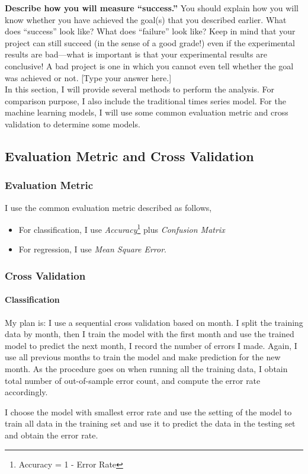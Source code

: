 \documentclass[a4paper,11pt]{article}
\begin{document}
\textbf{Describe how you will measure “success.”} You should explain how you will know whether you have achieved the goal(s) that you described earlier. What does “success” look like? What does “failure” look like? Keep in mind that your project can still succeed (in the sense of a good grade!) even if the experimental results are bad—what is important is that your experimental results are conclusive! A bad project is one in which you cannot even tell whether the goal was achieved or not. 
[Type your answer here.]
\\

In this section, I will provide several methods to perform the analysis. For comparison purpose, I also include the traditional times series model. For the machine learning models, I will use some common evaluation metric and cross validation to determine some models.
\subsection{Evaluation Metric and Cross Validation}

\subsubsection{Evaluation Metric}
I use the common evaluation metric described as follows,
\begin{itemize}
\item For classification, I use \emph{Accuracy}\footnote{Accuracy = 1 -  Error Rate} plus \emph{Confusion Matrix}
\item For regression, I use \emph{Mean Square Error}.
\end{itemize}
\subsubsection{Cross Validation}
\paragraph{Classification} My plan is:  I use a sequential cross validation based on month. I split the training data by month, then I train the model with the first month and use the trained model to predict the next month, I record the number of errors I made. Again, I use all previous months to train the model and make prediction for the new month. As the procedure goes on when running all the training data, I obtain total number of out-of-sample error count, and compute the error rate accordingly. \par
I choose the model with smallest error rate and use the setting of the model to train all data in the training set and use it to predict the data in the testing set and obtain the error rate. \par
\end{document}
